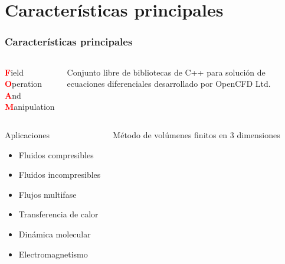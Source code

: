 \section{Caracter\'isticas principales}        
\begin{frame}
    \frametitle{Caracter\'isticas principales}
    
    \begin{block}{}
        \begin{columns}
        
            \textcolor{red}{\textbf{F}}ield \\ 
            \textcolor{red}{\textbf{O}}peration \\
            \textcolor{red}{\textbf{A}}nd \\
            \textcolor{red}{\textbf{M}}anipulation
            
            
            \centering
            Conjunto libre de bibliotecas de C++ para soluci\'on de ecuaciones diferenciales desarrollado por OpenCFD Ltd.
        \end{columns}                        
    \end{block}
        

    \begin{columns}
    
        \begin{block}{Aplicaciones}
            \begin{itemize}
                \item Fluidos compresibles
                \item Fluidos incompresibles
                \item Flujos multifase
                \item Transferencia de calor
                \item Din\'amica molecular
                \item Electromagnetismo
            \end{itemize}
        \end{block}
        
        \begin{exampleblock}{}
            \centering
            M\'etodo de vol\'umenes finitos en 3 dimensiones
        \end{exampleblock}        
        

\end{columns}
\end{frame}
